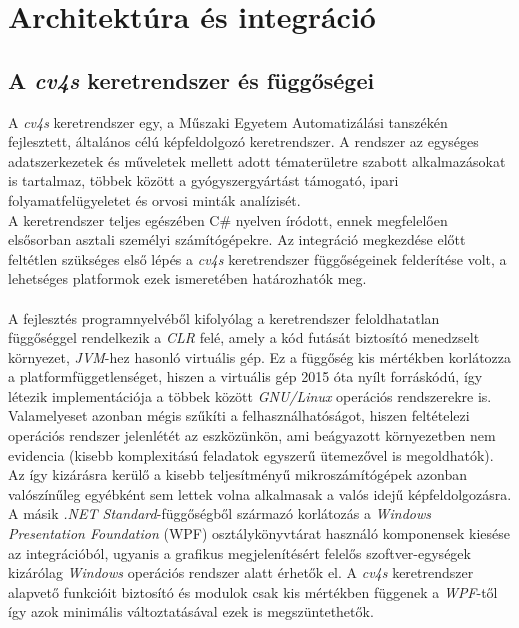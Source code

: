 \chapter{Architektúra és integráció} \label{architektura_fejezet}

\section{A \emph{cv4s} keretrendszer és függőségei} \label{fuggosegek}


A \emph{cv4s} keretrendszer egy, a Műszaki Egyetem Automatizálási tanszékén fejlesztett, általános célú képfeldolgozó keretrendszer. A rendszer az egységes adatszerkezetek és műveletek mellett adott tématerületre szabott alkalmazásokat is tartalmaz, többek között a gyógyszergyártást támogató, ipari folyamatfelügyeletet és orvosi minták analízisét. \\
A keretrendszer teljes egészében C\# nyelven íródott, ennek megfelelően elsősorban asztali személyi számítógépekre. Az integráció megkezdése előtt feltétlen szükséges első lépés a \emph{cv4s} keretrendszer függőségeinek felderítése volt, a lehetséges platformok ezek ismeretében határozhatók meg. \\
\\
A fejlesztés programnyelvéből kifolyólag a keretrendszer feloldhatatlan függőséggel rendelkezik a \textit{CLR} felé, amely a kód futását biztosító menedzselt környezet, \emph{JVM}-hez hasonló virtuális gép. Ez a függőség kis mértékben korlátozza a platformfüggetlenséget, hiszen a virtuális gép 2015 óta nyílt forráskódú, így létezik implementációja a többek között \emph{GNU/Linux} operációs rendszerekre is. Valamelyeset azonban mégis szűkíti a felhasználhatóságot, hiszen feltételezi operációs rendszer jelenlétét az eszközünkön, ami beágyazott környezetben nem evidencia (kisebb komplexitású feladatok egyszerű ütemezővel is megoldhatók). Az így kizárásra kerülő a kisebb teljesítményű mikroszámítógépek azonban valószínűleg egyébként sem lettek volna alkalmasak a valós idejű képfeldolgozásra. \\
A másik \emph{.NET Standard}-függőségből származó korlátozás a \textit{Windows Presentation Foundation} (WPF) osztálykönyvtárat használó komponensek kiesése az integrációból, ugyanis a grafikus megjelenítésért felelős szoftver-egységek kizárólag \textit{Windows} operációs rendszer alatt érhetők el. A \emph{cv4s} keretrendszer alapvető funkcióit biztosító  és  modulok csak kis mértékben függenek a \emph{WPF}-től így azok minimális változtatásával ezek is megszüntethetők.\\
